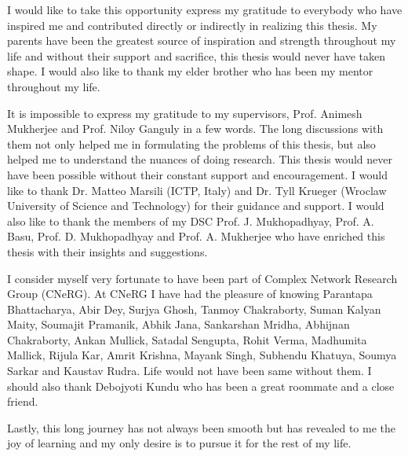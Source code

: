 
\noindent
I would like to take this opportunity express my gratitude to everybody who have inspired me and contributed directly or indirectly in realizing this
thesis. My parents have been the greatest source of inspiration and strength throughout my life and without their support and sacrifice, this thesis would never have taken shape. I would also like to thank my elder brother who has been my mentor throughout my life.     

It is impossible to express my gratitude to my supervisors, Prof.
Animesh Mukherjee and Prof. Niloy Ganguly in a few words. The long discussions with them not only helped me in formulating the problems of this thesis, but
also helped me to understand the nuances of doing research. This thesis would never have been possible without their constant support and encouragement. 
I would like to thank Dr. Matteo Marsili (ICTP, Italy) and Dr. Tyll Krueger (Wroclaw University of Science and Technology) for their guidance and support. 
I would also like to thank the members of my DSC Prof. J. Mukhopadhyay, Prof. A. Basu, Prof. D. Mukhopadhyay and Prof. A. Mukherjee  who have enriched this thesis with their insights and suggestions. 

I consider myself very fortunate to have been part of Complex Network Research Group (CNeRG). At CNeRG I have had the pleasure of knowing Parantapa Bhattacharya, Abir Dey, Surjya Ghosh, Tanmoy Chakraborty, Suman Kalyan Maity, Soumajit Pramanik, Abhik Jana, Sankarshan Mridha, Abhijnan Chakraborty, Ankan Mullick, Satadal Sengupta, Rohit Verma, Madhumita Mallick, Rijula Kar, Amrit Krishna, Mayank Singh, Subhendu Khatuya, Soumya Sarkar and Kaustav Rudra. Life would not have been same without them. I should also thank Debojyoti Kundu who has been a great roommate and a close friend.     

Lastly, this long journey has not always been smooth but has revealed to me the joy of learning and my only desire is to pursue it for the rest of my life. 








